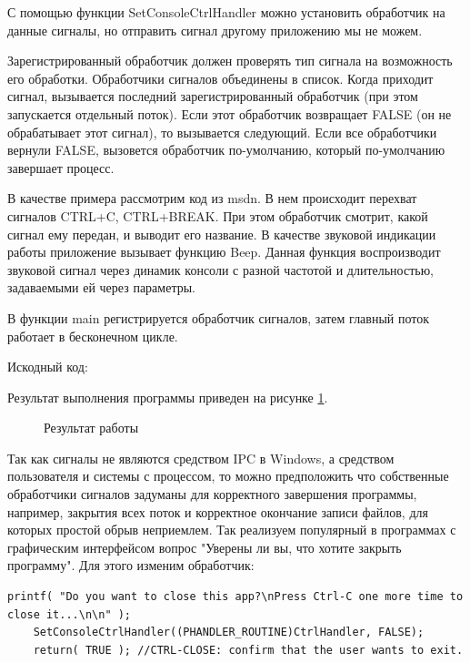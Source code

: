 \documentclass[a4paper]{article}
\begin{document}
	С помощью функции SetConsoleCtrlHandler можно установить обработчик на данные сигналы, но отправить сигнал другому приложению мы не можем. 
	
	Зарегистрированный обработчик должен проверять тип сигнала на возможность его обработки. Обработчики сигналов объединены в список. Когда приходит сигнал, вызывается последний зарегистрированный обработчик (при этом запускается отдельный поток). Если этот обработчик возвращает FALSE (он не обрабатывает этот сигнал), то вызывается следующий. Если все обработчики вернули FALSE, вызовется обработчик по-умолчанию, который по-умолчанию завершает процесс.
	
	В качестве примера рассмотрим код из msdn. В нем происходит перехват сигналов CTRL+C, CTRL+BREAK. При этом обработчик смотрит, какой сигнал ему передан, и выводит его название. В качестве звуковой индикации работы приложение вызывает функцию Beep. Данная функция воспроизводит звуковой сигнал через динамик консоли с разной частотой и длительностью, задаваемыми ей через параметры.
	
	В функции main регистрируется обработчик сигналов, затем главный поток работает в бесконечном цикле.
	
	Искодный код:
	
	
	Результат выполнения программы приведен на рисунке \ref{img:task7}.
	\begin{figure}[h!]
		\caption{Результат работы}
		\label{img:task7}
	\end{figure}
	Так как сигналы не являются средством IPC в Windows, а средством пользователя и системы с процессом, то можно предположить что собственные обработчики сигналов задуманы для корректного завершения программы, например, закрытия всех поток и корректное окончание записи файлов, для которых простой обрыв неприемлем. Так реализуем популярный в программах с графическим интерфейсом вопрос "Уверены ли вы, что хотите закрыть программу". Для этого изменим обработчик:
	\begin{lstlisting}[style=crs_cpp]
	printf( "Do you want to close this app?\nPress Ctrl-C one more time to close it...\n\n" );
	SetConsoleCtrlHandler((PHANDLER_ROUTINE)CtrlHandler, FALSE);
	return( TRUE ); //CTRL-CLOSE: confirm that the user wants to exit. \end{lstlisting}
\end{document}

